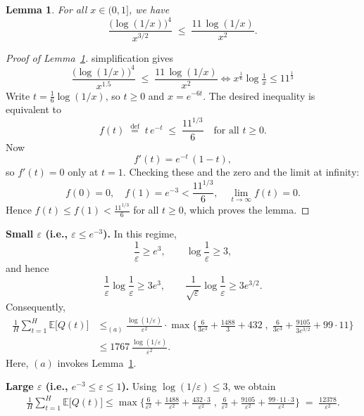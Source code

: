 \documentclass[12pt,draftcls, onecolumn]{IEEEtran}
\newcommand{\velb}{\varepsilon}
\newcommand{\EE}{\mathbb{E}}
\newtheorem{lemma}{Lemma}
\begin{document}
{\begin{lemma}\label{lem:log4}
For all \(x \in (0,1]\), we have
\[
  \frac{\bigl(\log(1/x)\bigr)^{4}}{x^{3/2}}
  \;\le\;
  \frac{11\,\log(1/x)}{x^{2}}.
\]
\end{lemma}


\begin{proof}[Proof of Lemma~\ref{lem:log4}]
simplification gives
  \[
    \frac{\bigl(\log(1/x)\bigr)^{4}}{x^{1.5}}
    \;\le\;
    \frac{11\,\log(1/x)}{x^{2}}
    \Leftrightarrow
    x^{\tfrac{1}{6}} \log\tfrac{1}{x} \leq 11^{\tfrac{1}{3}}
  \]
  Write \(t = \tfrac{1}{6}\log(1/x)\), so \(t \ge 0\) and \(x = e^{-6t}\).  The desired inequality
  is equivalent to
  \[
    f(t) \;\stackrel{\text{def}}{=}\;t\,e^{-t}\;\le\;\frac{11^{1/3}}{6}
    \quad\text{for all }t\ge0.
  \]
  Now
  \[
    f'(t)
    = {e^{-t}}\,(1 - t),
  \]
  so \(f'(t)=0\) only at \(t=1\).  Checking these and the zero and the limit at infinity:
  \[
    f(0)=0,
    \quad
    f(1)=e^{-3} < \frac{11^{1/3}}{6},
    \quad
    \lim_{t\to\infty} f(t)=0.
  \]
  Hence \(f(t)\le f(1)<\frac{11^{1/3}}{6}\) for all \(t\ge0\), which proves the lemma.


\end{proof}


\noindent\textbf{Small \(\velb\) (i.e., \(\velb \le e^{-3}\)).}
In this regime,
\[
  \frac{1}{\velb}\ge e^{3}, \qquad \log\!\frac{1}{\velb}\ge 3,
\]
and hence
\[
  \frac{1}{\velb}\log\!\frac{1}{\velb}\ge 3e^{3},
  \qquad
  \frac{1}{\sqrt{\velb}}\log\!\frac{1}{\velb}\ge 3e^{3/2}.
\]
Consequently,
\begin{align}\label{eqn:2222}
  \frac{1}{H}\sum_{t=1}^{H}\EE\bigl[Q(t)\bigr]
  &\le_{(a)}
  \frac{\log(1/\velb)}{\velb^{2}}
  \cdot
  \max\!\Biggl\{
    \frac{6}{3e^{3}}
    + \frac{1488}{3}
    + 432
    \;,\;
    \frac{6}{3e^{3}}
    + \frac{9105}{3e^{3/2}}
    + 99\cdot 11
  \Biggr\}
  \nonumber\\&\le
  1767\,\frac{\log(1/\velb)}{\velb^{2}}.
\end{align}
Here, \((a)\) invokes Lemma~\ref{lem:log4}.


\noindent\textbf{Large \(\velb\) (i.e., \(e^{-3}\le \velb \le 1\)).}
Using \(\log(1/\velb)\le 3\), we obtain
\begin{align}\label{eqn:11111}
    \frac{1}{H}\sum_{t=1}^H \EE\bigl[Q(t)\bigr]
    \le
    \max\!\Biggl\{
    \frac{6}{\velb^2}
    + \frac{1488}{\velb^2}
    + \frac{432\cdot 3}{\velb^2}
    \;,\;
    \frac{6}{\velb^2}
    + \frac{9105}{\velb^{2}}
    + \frac{99\cdot 11 \cdot 3}{\velb^{2}}
    \Biggr\}
    \;=\; \frac{12378}{\velb^2}.
\end{align}

}
\end{document}
